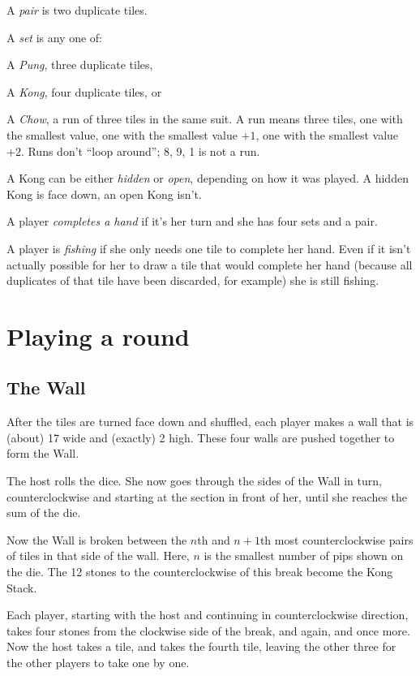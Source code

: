 \documentclass{article}
\begin{document}
A \emph{pair} is two duplicate tiles.

A \emph{set} is any one of:
\begin{enumerate*}
    \item A \emph{Pung}, three duplicate tiles,
    \item A \emph{Kong}, four duplicate tiles, or
    \item A \emph{Chow}, a run of three tiles in the same suit. A run means three tiles, one with the smallest value, one with the smallest value $+1$, one with the smallest value $+2$. Runs don't ``loop around''; 8, 9, 1 is not a run.
\end{enumerate*}

A Kong can be either \emph{hidden} or \emph{open}, depending on how it was played. A hidden Kong is face down, an open Kong isn't.

A player \emph{completes a hand} if it's her turn and she has four sets and a pair.

A player is \emph{fishing} if she only needs one tile to complete her hand. Even if it isn't actually possible for her to draw a tile that would complete her hand (because all duplicates of that tile have been discarded, for example) she is still fishing.

\section{Playing a round}
\subsection{The Wall}
After the tiles are turned face down and shuffled, each player makes a wall that is (about) 17 wide and (exactly) 2 high. These four walls are pushed together to form the Wall.

The host rolls the dice. She now goes through the sides of the Wall in turn, counterclockwise and starting at the section in front of her, until she reaches the sum of the die.

Now the Wall is broken between the $n$th and $n+1$th most counterclockwise pairs of tiles in that side of the wall. Here, $n$ is the smallest number of pips shown on the die.
The 12 stones to the counterclockwise of this break become the Kong Stack.

Each player, starting with the host and continuing in counterclockwise direction, takes four stones from the clockwise side of the break, and again, and once more. Now the host takes a tile, and takes the fourth tile, leaving the other three for the other players to take one by one.
\end{document}
